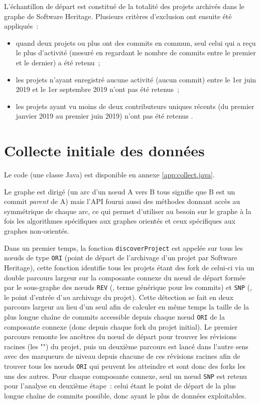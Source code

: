 L'échantillon de départ est constitué de la totalité des projets archivés dans le graphe de Software Heritage.
Plusieurs critères d'exclusion ont ensuite été appliqués :

\begin{itemize}
    \item quand deux projets ou plus ont des \glspl{commit} en commun, seul celui qui a reçu le plus
        d'activité (mesuré en regardant le nombre de \glspl{commit} entre le premier et le dernier) a été
        retenu ;
    \item les projets n'ayant enregistré aucune activité (aucun commit) entre le 1er juin 2019 et le 1er
        septembre 2019 n'ont pas été retenus ;
    \item les projets ayant vu moins de deux contributeurs uniques récents (du premier janvier 2019 au premier
        juin 2019) n'ont pas été retenus \parencite[voir][]{mining-github-2014}.
\end{itemize}

\section{Collecte initiale des données}


Le code (une classe Java) est disponible en annexe \ref{app:collect.java}.

Le graphe est dirigé (un arc d'un nœud A vers B tous signifie que B est un \gls{commit} \emph{parent} de A)
mais l'API fourni aussi des méthodes donnant accès au symmétrique de chaque arc, ce qui permet d'utiliser au
besoin sur le graphe à la fois les algorithmes spécifiques aux graphes orientés et ceux spécifiques aux
graphes non-orientés.

Dans un premier temps, la fonction \texttt{discoverProject} est appelée sur tous les nœuds de type
\texttt{ORI} (point de départ de l'archivage d'un projet par Software Heritage), cette fonction identifie tous
les projets étant des \gls{fork} de celui-ci via un double parcours largeur sur la composante connexe du nœud
de départ formée par le sous-graphe des nœuds \texttt{REV} (, terme générique pour les
\glspl{commit}) et \texttt{SNP} (, le point d'entrée d'\emph{un} archivage du projet). Cette
détection se fait en deux parcours largeur au lieu d'un seul afin de calculer en même temps la taille de la
plus longue chaîne de commits accessible depuis chaque nœud \texttt{ORI} de la composante connexe (donc depuis
chaque fork du projet initial). Le premier parcours remonte les ancêtres du nœud de départ pour trouver les
révisions racines (les "") du projet, puis un deuxième parcours est lancé dans l'autre
sens avec des marqueurs de niveau depuis chacune de ces révisions racines afin de trouver tous les nœuds
\texttt{ORI} qui peuvent les atteindre et sont donc des \glspl{fork} les uns des autres. Pour chaque
composante connexe, seul un nœud \texttt{SNP} est retenu pour l'analyse en deuxième étape : celui étant le
point de départ de la plus longue chaîne de \glspl{commit} possible, donc ayant le plus de données
exploitables.


